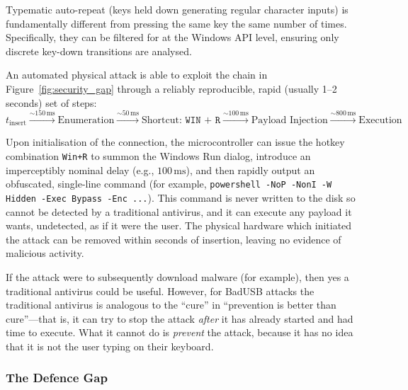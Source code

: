 \begin{note}
	Typematic auto-repeat (keys held down generating regular character inputs) is fundamentally different from pressing the same key the same number of times. Specifically, they can be filtered for at the Windows API level, ensuring only discrete key-down transitions are analysed.
\end{note}



An automated physical attack is able to exploit the chain in Figure~\ref{fig:security_gap} through a reliably reproducible, rapid (usually 1--2 seconds) set of steps:
{\footnotesize
\begin{equation}
	\label{eq:2_1_timeline}
	t_{\text{insert}} \xrightarrow{\sim 150\,\text{ms}} \text{Enumeration} \xrightarrow{\sim 50\,\text{ms}} \text{Shortcut: } \texttt{WIN + R} \xrightarrow{\sim 100\,\text{ms}} \text{Payload Injection} \xrightarrow{\sim 800\,\text{ms}} \text{Execution}
\end{equation}}

Upon initialisation of the connection, the microcontroller can issue the hotkey combination \texttt{Win+R} to summon the Windows Run dialog, introduce an imperceptibly nominal delay (e.g., $100\,\text{ms}$), and then rapidly output an obfuscated, single-line command (for example, \texttt{powershell -NoP -NonI -W Hidden -Exec Bypass -Enc ...}). This command is never written to the disk so cannot be detected by a traditional antivirus, and it can execute any payload it wants, undetected, as if it were the user. The physical hardware which initiated the attack can be removed within seconds of insertion, leaving no evidence of malicious activity.

\begin{note}
	If the attack were to subsequently download malware (for example), then yes a traditional antivirus could be useful. However, for BadUSB attacks the traditional antivirus is analogous to the ``cure'' in ``prevention is better than cure''---that is, it can try to stop the attack \textit{after} it has already started and had time to execute. What it cannot do is \textit{prevent} the attack, because it has no idea that it is not the user typing on their keyboard.
\end{note}

\subsubsection{The Defence Gap}

